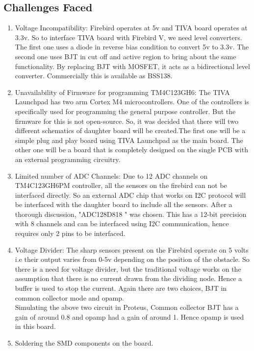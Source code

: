 \documentclass[a4paper,12pt,oneside]{book}
\begin{document}
	\subsection{Challenges Faced}
		\begin{enumerate}
			\item Voltage Incompatibility: Firebird operates at 5v and TIVA board operates at 3.3v. So to interface TIVA board with Firebird V, we need level converters. The first one uses a diode in reverse bias condition to convert 5v to 3.3v. The second one uses BJT in cut off and active region to bring about the same functionality. By replacing BJT with MOSFET, it acts as a bidirectional level converter. Commercially this is available as BSS138.
			\item Unavailability of Firmware for programming TM4C123GH6: The TIVA Launchpad has two arm Cortex M4 microcontrollers. One of the controllers is specifically used for programming the general purpose controller. But the firmware for this is not open-source. So, it was decided that there will two different schematics of daughter board will be created.The first one will be a simple plug and play board using TIVA Launchpad as the main board. The other one will be a board that is completely designed on the single PCB with an external programming circuitry.
			\item Limited number of ADC Channels: Due to 12 ADC channels on TM4C123GH6PM controller, all the sensors on the firebird can not be interfaced directly. So an external ADC chip that works on I2C protocol will be interfaced with the daughter board to include all the sensors. After a thorough discussion, "ADC128D818 " was chosen. This has a 12-bit precision with 8 channels and can be interfaced using I2C communication, hence requires only 2 pins to be interfaced.
			\item Voltage Divider: The sharp sensors present on the Firebird operate on 5 volts i.e their output varies from 0-5v depending on the position of the obstacle. So there is a need for voltage divider, but the traditional voltage works on the assumption that there is no current drawn from the dividing node. Hence a buffer is used to stop the current. Again there are two choices, BJT in common collector mode and opamp. \\
			Simulating the above two circuit in Proteus, Common collector BJT has a gain of around 0.8 and opamp had a gain of around 1. Hence opamp is used in this board.
			\item Soldering the SMD components on the board.
		\end{enumerate}
\end{document}
